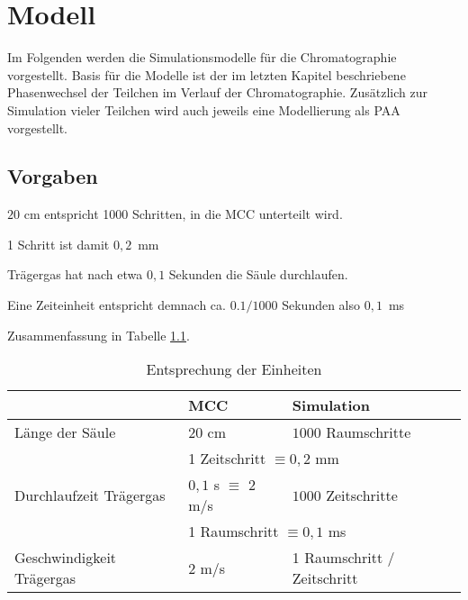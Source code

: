 \chapter{Modell} %
\label{chapter:mod}

Im Folgenden werden die Simulationsmodelle für die Chromatographie vorgestellt. Basis für die Modelle ist der im letzten Kapitel beschriebene Phasenwechsel der Teilchen im Verlauf der Chromatographie. Zusätzlich zur Simulation vieler Teilchen wird auch jeweils eine Modellierung als PAA vorgestellt.


\section{Vorgaben}

$20$ cm entspricht 1000 Schritten, in die MCC unterteilt wird.

1 Schritt ist damit $0,2$\, mm

Trägergas hat nach etwa $0,1$ Sekunden die Säule durchlaufen.

Eine Zeiteinheit entspricht demnach ca. $0.1/1000$ Sekunden also $0,1$\, ms

Zusammenfassung in Tabelle \ref{einheiten}.

\begin{table}[H]
\centering
\caption{Entsprechung der Einheiten}
\label{einheiten}
\begin{tabular}{|l||l|l|}
\hline
			  & MCC                 			& Simulation              \\ \hline \hline
Länge der Säule           & $20$ cm               		& $1000$ Raumschritte       \\ \hline
			  & \multicolumn{2}{l|}{1 Zeitschritt $\equiv 0,2$ mm} \\ \hline
Durchlaufzeit Trägergas   & $0,1$ s $\equiv$ $2$ m/s       	& $1000$ Zeitschritte       \\ \hline
			  & \multicolumn{2}{l|}{1 Raumschritt $\equiv 0,1$ ms} \\ \hline
Geschwindigkeit Trägergas & $2$ m/s 				& 1 Raumschritt / Zeitschritt \\ \hline	
\end{tabular}
\end{table}

